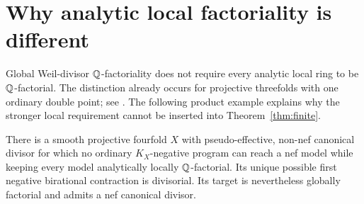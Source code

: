 \section{Why analytic local factoriality is different}
\label{sec:local-convention}

Global Weil-divisor $\mathbb Q$-factoriality does not require every analytic local
ring to be $\mathbb Q$-factorial.  The distinction already occurs for projective
threefolds with one ordinary double point; see
\cite[Definition~5.1, Remark~(b)]{Reid}.  The following product example
explains why the stronger local requirement cannot be inserted into
Theorem~\ref{thm:finite}.

\begin{proposition}\label{prop:local-convention}
There is a smooth projective fourfold $X$ with pseudo-effective, non-nef
canonical divisor for which no ordinary $K_X$-negative program can reach a
nef model while keeping every model analytically locally
$\mathbb Q$-factorial.  Its unique possible first negative birational contraction
is divisorial.  Its target is nevertheless globally factorial and admits
a nef canonical divisor.
\end{proposition}

